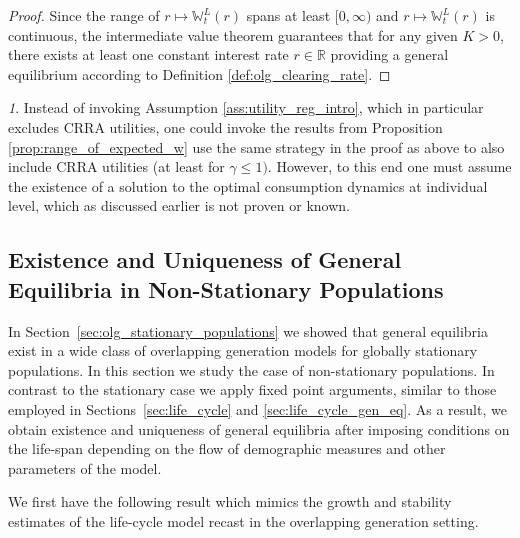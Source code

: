 \documentclass[11pt,oneside,english,reqno,dvipsnames,table]{amsart}
\numberwithin{equation}{section}
\theoremstyle{plain}
\theoremstyle{definition}
\theoremstyle{remark}
\newtheorem{rem}[thm]{\protect\remarkname}
\theoremstyle{plain}
\theoremstyle{plain}
\theoremstyle{plain}
\theoremstyle{plain}
\theoremstyle{plain}
\theoremstyle{plain}
\theoremstyle{plain}
\providecommand{\remarkname}{Remark}
\providecommand{\remarkname}{Remark}
\newcommand{\RR}{\mathbb{R}}
\newcommand{\WW}{\mathbb{W}}
\numberwithin{thm}{section}
\begin{document}
{\begin{proof}
Since the range of $r\mapsto \WW_t^L(r)$ spans at least $[0,\infty)$ and $r \mapsto \WW^L_t(r)$ is continuous, the intermediate value theorem guarantees that for any given $K> 0$, there exists at least one constant interest rate $r\in \RR$ providing a general equilibrium according to Definition \ref{def:olg_clearing_rate}.
\end{proof}

\begin{rem}
    Instead of invoking Assumption \ref{ass:utility_reg_intro}, which in particular excludes CRRA utilities, one could invoke the results from Proposition \ref{prop:range_of_expected_w} use the same strategy in the proof as above to also include CRRA utilities (at least for $\gamma\leq 1)$. However, to this end one must assume the existence of a solution to the optimal consumption dynamics at individual level, which as discussed earlier is not proven or known. 
\end{rem}
}




\subsection{Existence and Uniqueness of General Equilibria in Non-Stationary Populations}


In Section~\ref{sec:olg_stationary_populations} we showed that general equilibria exist in a wide class of overlapping generation models for globally stationary populations. In this section we study the case of non-stationary populations. In contrast to the stationary case we apply  fixed point arguments, similar to those employed in Sections~\ref{sec:life_cycle} and \ref{sec:life_cycle_gen_eq}. As a result, we obtain existence and uniqueness of general equilibria after imposing conditions on the life-span depending on the flow of demographic measures and other parameters of the model.

We first have the following result which mimics the growth and stability estimates of the life-cycle model recast in the overlapping generation setting.
\end{document}
